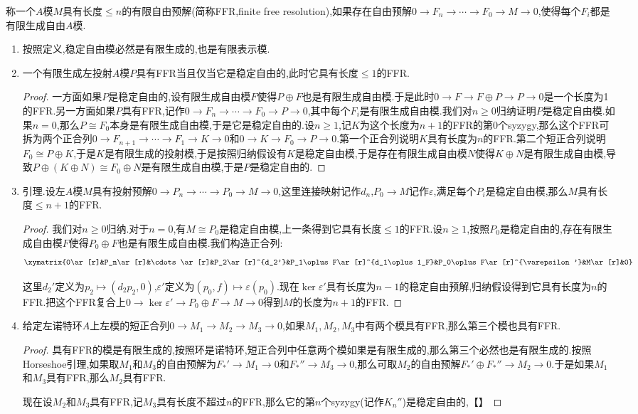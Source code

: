 称一个$A$模$M$具有长度$\le n$的有限自由预解(简称FFR,finite free resolution),如果存在自由预解$0\to F_n\to\cdots\to F_0\to M\to0$,使得每个$F_i$都是有限生成自由$A$模.
\begin{enumerate}
	\item 按照定义,稳定自由模必然是有限生成的,也是有限表示模.
	\item 一个有限生成左投射$A$模$P$具有FFR当且仅当它是稳定自由的,此时它具有长度$\le1$的FFR.
	\begin{proof}
		
		一方面如果$P$是稳定自由的,设有限生成自由模$F$使得$P\oplus F$也是有限生成自由模.于是此时$0\to F\to F\oplus P\to P\to0$是一个长度为1的FFR.另一方面如果$P$具有FFR,记作$0\to F_n\to\cdots\to F_0\to P\to0$,其中每个$F_i$是有限生成自由模.我们对$n\ge0$归纳证明$P$是稳定自由模.如果$n=0$,那么$P\cong F_0$本身是有限生成自由模,于是它是稳定自由的.设$n\ge1$,记$K$为这个长度为$n+1$的FFR的第0个syzygy,那么这个FFR可拆为两个正合列$0\to F_{n+1}\to\cdots\to F_1\to K\to0$和$0\to K\to F_0\to P\to0$.第一个正合列说明$K$具有长度为$n$的FFR.第二个短正合列说明$F_0\cong P\oplus K$,于是$K$是有限生成的投射模,于是按照归纳假设有$K$是稳定自由模,于是存在有限生成自由模$N$使得$K\oplus N$是有限生成自由模,导致$P\oplus(K\oplus N)\cong F_0\oplus N$是有限生成自由模,于是$P$是稳定自由的.
	\end{proof}
    \item 引理.设左$A$模$M$具有投射预解$0\to P_n\to\cdots\to P_0\to M\to0$,这里连接映射记作$d_n$,$P_0\to M$记作$\varepsilon$,满足每个$P_i$是稳定自由模,那么$M$具有长度$\le n+1$的FFR.
    \begin{proof}
    	
    	我们对$n\ge0$归纳.对于$n=0$,有$M\cong P_0$是稳定自由模,上一条得到它具有长度$\le1$的FFR.设$n\ge1$,按照$P_0$是稳定自由的,存在有限生成自由模$F$使得$P_0\oplus F$也是有限生成自由模.我们构造正合列:
    	$$\xymatrix{0\ar[r]&P_n\ar[r]&\cdots\ar[r]&P_2\ar[r]^{d_2'}&P_1\oplus F\ar[r]^{d_1\oplus 1_F}&P_0\oplus F\ar[r]^{\varepsilon'}&M\ar[r]&0}$$
    	
    	这里$d_2'$定义为$p_2\mapsto(d_2p_2,0)$,$\varepsilon'$定义为$(p_0,f)\mapsto\varepsilon(p_0)$.现在$\ker\varepsilon'$具有长度为$n-1$的稳定自由预解,归纳假设得到它具有长度为$n$的FFR.把这个FFR复合上$0\to\ker\varepsilon'\to P_0\oplus F\to M\to0$得到$M$的长度为$n+1$的FFR.
    \end{proof}
    \item 给定左诺特环$A$上左模的短正合列$0\to M_1\to M_2\to M_3\to0$,如果$M_1,M_2,M_3$中有两个模具有FFR,那么第三个模也具有FFR.
    \begin{proof}
    	
    	具有FFR的模是有限生成的,按照环是诺特环,短正合列中任意两个模如果是有限生成的,那么第三个必然也是有限生成的.按照Horseshoe引理,如果取$M_1$和$M_3$的自由预解为$F_*'\to M_1\to0$和$F_*''\to M_3\to0$,那么可取$M_2$的自由预解$F_*'\oplus F_*''\to M_2\to0$.于是如果$M_1$和$M_3$具有FFR,那么$M_2$具有FFR.
    	
    	现在设$M_2$和$M_3$具有FFR,记$M_3$具有长度不超过$n$的FFR,那么它的第$n$个syzygy(记作$K_n''$)是稳定自由的,【】
    \end{proof}
\end{enumerate}

